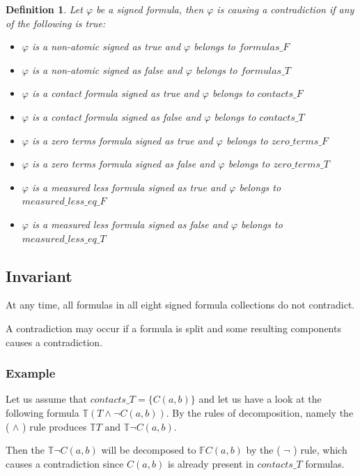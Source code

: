 \documentclass{article}
\newtheorem{defn}{Definition}[section]
\newcommand{\signT}{\mathbb{T}}
\newcommand{\signF}{\mathbb{F}}
\begin{document}
	\begin{defn}
	Let $\varphi$ be a signed formula, then $\varphi$ is causing a contradiction if any of the following is true:
	\begin{itemize}
		\item $\varphi$ is a non-atomic signed as true and $\varphi$ belongs to $formulas\_F$
		\item $\varphi$ is a non-atomic signed as false and $\varphi$ belongs to $formulas\_T$
		\item $\varphi$ is a contact formula signed as true and $\varphi$ belongs to $contacts\_F$
		\item $\varphi$ is a contact formula signed as false and $\varphi$ belongs to $contacts\_T$
		\item $\varphi$ is a zero terms formula signed as true and $\varphi$ belongs to $zero\_terms\_F$
		\item $\varphi$ is a zero terms formula signed as false and $\varphi$ belongs to $zero\_terms\_T$
		\item $\varphi$ is a measured less formula signed as true and $\varphi$ belongs to $measured\_less\_eq\_F$
		\item $\varphi$ is a measured less formula signed as false and $\varphi$ belongs to $measured\_less\_eq\_T$
	\end{itemize}
	\end{defn}
	\subsection*{Invariant}
	At any time, all formulas in all eight signed formula collections do not contradict.

	A contradiction may occur if a formula is split and some resulting components causes a contradiction.

	\subsubsection*{Example}
	Let us assume that $contacts\_T = \{ C(a, b)\}$ and let us have a look at the following formula $\signT(T \wedge \neg C(a,b))$.
	\newline
	By the rules of decomposition, namely the ( $\wedge$ ) rule produces $\signT T \text{ and } \signT\neg C(a,b)$.

	Then the $\signT\neg C(a,b)$ will be decomposed to $\signF C(a,b)$ by the ( $\neg$ ) rule, which causes a contradiction since $C(a,b)$ is already present in $contacts\_T$ formulas.
\end{document}

